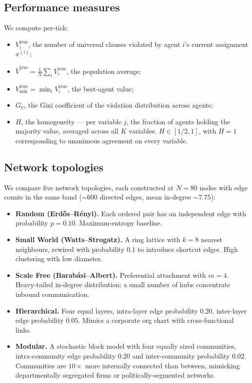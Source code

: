 \documentclass{article}
\begin{document}
\subsection{Performance measures}

We compute per-tick:
\begin{itemize}
  \item $V_i^{\text{true}}$, the number of universal clauses violated by agent $i$'s current assignment $x^{(i)}$;
  \item $\bar V^{\text{true}} = \tfrac{1}{N}\sum_i V_i^{\text{true}}$, the population average;
  \item $V^{\text{true}}_{\min} = \min_i V_i^{\text{true}}$, the best-agent value;
  \item $G_V$, the Gini coefficient of the violation distribution across agents;
  \item $H$, the homogeneity --- per variable $j$, the fraction of agents holding the majority value, averaged across all $K$ variables. $H \in [1/2, 1]$, with $H=1$ corresponding to unanimous agreement on every variable.
\end{itemize}

\subsection{Network topologies}

We compare five network topologies, each constructed at $N=80$ nodes with edge counts in the same band ($\sim 600$ directed edges, mean in-degree $\sim 7.75$):

\begin{itemize}
  \item \textbf{Random (Erd\H{o}s--R\'enyi).} Each ordered pair has an independent edge with probability $p=0.10$. Maximum-entropy baseline.
  \item \textbf{Small World (Watts--Strogatz).} A ring lattice with $k=8$ nearest neighbours, rewired with probability $0.1$ to introduce shortcut edges. High clustering with low diameter.
  \item \textbf{Scale Free (Barab\'asi--Albert).} Preferential attachment with $m=4$. Heavy-tailed in-degree distribution; a small number of hubs concentrate inbound communication.
  \item \textbf{Hierarchical.} Four equal layers, intra-layer edge probability $0.20$, inter-layer edge probability $0.05$. Mimics a corporate org chart with cross-functional links.
  \item \textbf{Modular.} A stochastic block model with four equally sized communities, intra-community edge probability $0.20$ and inter-community probability $0.02$. Communities are $10\times$ more internally connected than between, mimicking departmentally segregated firms or politically-segmented networks.
\end{itemize}
\end{document}

